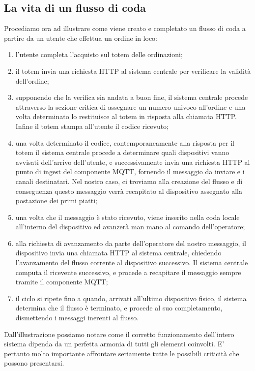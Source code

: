 \documentclass[a4paper, titlepage, 12pt, openright, twoside]{book}
\begin{document}
\subsection{La vita di un flusso di coda}
Procediamo ora ad illustrare come viene creato e completato un flusso di coda a partire da un utente che effettua un ordine in loco:
\begin{enumerate}
	\item l'utente completa l'acquisto sul totem delle ordinazioni;
	\item il totem invia una richiesta HTTP al sistema centrale per verificare la validità dell'ordine;
	\item supponendo che la verifica sia andata a buon fine, il sistema centrale procede attraverso la sezione critica di assegnare un numero univoco all'ordine
		  e una volta determinato lo restituisce al totem in risposta alla chiamata HTTP. Infine il totem stampa all'utente il codice ricevuto;
	\item una volta determinato il codice, contemporaneamente alla risposta per il totem il sistema centrale procede a determinare quali dispositivi vanno avvisati dell'arrivo dell'utente, e successivamente invia una richiesta HTTP al punto di ingest del componente MQTT, fornendo il messaggio da inviare e i canali destinatari. Nel nostro caso, ci troviamo alla creazione del flusso e di conseguenza questo messaggio verrà recapitato al dispositivo assegnato alla postazione dei primi piatti;
	\item una volta che il messaggio è stato ricevuto, viene inserito nella coda locale all'interno del dispositivo ed avanzerà man mano al comando dell'operatore;
	\item alla richiesta di avanzamento da parte dell'operatore del nostro messaggio, il dispositivo invia una chiamata HTTP al sistema centrale, chiedendo l'avanzamento del flusso
		  corrente al dispositivo successivo. Il sistema centrale computa il ricevente successivo, e procede a recapitare il messaggio sempre tramite il componente MQTT;
	\item il ciclo si ripete fino a quando, arrivati all'ultimo dispositivo fisico, il sistema determina che il flusso è terminato, e procede al suo completamento,
		  dismettendo i messaggi inerenti al flusso. 
\end{enumerate}

Dall'illustrazione possiamo notare come il corretto funzionamento dell'intero sistema dipenda da un perfetta armonia di tutti gli elementi coinvolti. E' pertanto molto importante affrontare seriamente tutte le possibili criticità che possono presentarsi.
\end{document}

